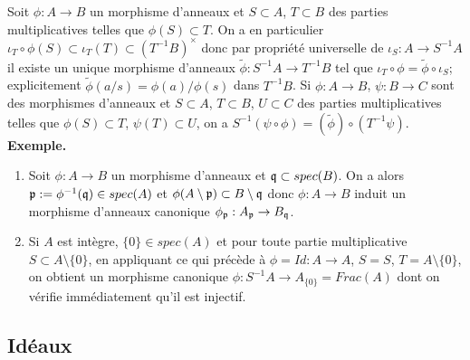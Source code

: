 \documentclass[a4paper, 12pt]{amsart}
\begin{document}
 \subsubsection{}\label{LocMorphismes}Soit $\phi:A\rightarrow B$ un morphisme d'anneaux et $S\subset A$, $T\subset B$ des parties multiplicatives telles que $\phi(S)\subset T$. On a en particulier $\iota_T\circ \phi(S)\subset \iota_T(T)\subset (T^{-1}B)^\times$ donc par propriété universelle de $\iota_S:A\rightarrow S^{-1}A$ il existe un unique morphisme d'anneaux $\tilde{\phi}:S^{-1}A\rightarrow T^{-1}B$ tel que $\iota_T\circ \phi=\tilde{\phi}\circ \iota_S$; explicitement $\tilde{\phi}(a/s)=\phi(a)/\phi(s)$ dans $T^{-1}B$. Si $\phi:A\rightarrow B$, $\psi:B\rightarrow C$ sont des morphismes d'anneaux et $S\subset A$, $T\subset B$, $U\subset C$ des parties multiplicatives telles que $\phi(S)\subset T$, $\psi(T)\subset U$, on a $S^{-1}(\psi\circ \phi)=(\tilde{\phi})\circ (T^{-1}\psi)$. \\

\textbf{Exemple.} 

\begin{enumerate}
\item Soit $\phi:A\rightarrow B$ un morphisme d'anneaux et $\frak{q}\subset spec(B)$. On a alors $\frak{p}:=\phi^{-1}(\frak{q})\in spec(A)$ et $\phi(A\setminus \frak{p})\subset B\setminus \frak{q}$ donc $\phi:A\rightarrow B$ induit un morphisme d'anneaux canonique $\phi_\frak{p}:A_{\frak{p}}\rightarrow B_{\frak{q}}$. 
 \item Si $A$ est intègre,  $\lbrace 0\rbrace\in spec(A)$ et pour toute partie multiplicative $S\subset A\setminus \lbrace 0\rbrace$, en appliquant ce qui précède à $\phi=Id:A\rightarrow A$, $S=S$, $T=A\setminus \lbrace 0\rbrace$, on obtient un morphisme canonique $\phi:S^{-1}A\rightarrow A_{\lbrace 0\rbrace}=Frac(A)$ dont on vérifie immédiatement qu'il est injectif. 
\end{enumerate}
\subsection{Idéaux}\label{LocIdeal} 
\end{document}
